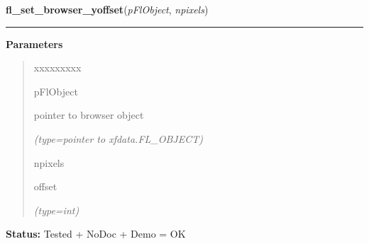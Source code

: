 \hspace{.8\funcindent}\begin{boxedminipage}{\funcwidth}

    \raggedright \textbf{fl\_set\_browser\_yoffset}(\textit{pFlObject}, \textit{npixels})

    \vspace{-1.5ex}

    \rule{\textwidth}{0.5\fboxrule}
\setlength{\parskip}{2ex}
\setlength{\parskip}{1ex}
      \textbf{Parameters}
      \vspace{-1ex}

      \begin{quote}
        \begin{Ventry}{xxxxxxxxx}

          \item[pFlObject]

          pointer to browser object

            {\it (type=pointer to xfdata.FL\_OBJECT)}

          \item[npixels]

          offset

            {\it (type=int)}

        \end{Ventry}

      \end{quote}

\textbf{Status:} Tested + NoDoc + Demo = OK



    \end{boxedminipage}

    \label{xformslib:flbrowser:fl_set_browser_rel_yoffset}

    \vspace{0.5ex}


